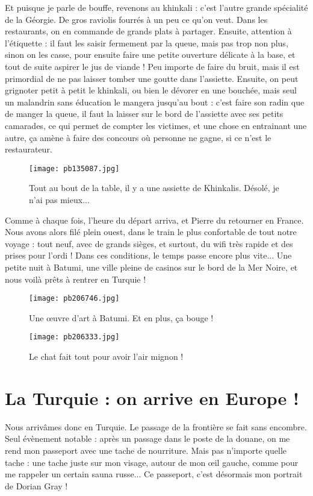 \documentclass{book}
\begin{document}
Et puisque je parle de bouffe, revenons au khinkali : c'est l'autre grande spécialité de la Géorgie. De gros raviolis fourrés à un peu ce qu'on veut. Dans les restaurants, on en commande de grands plats à partager. Ensuite, attention à l'étiquette : il faut les saisir fermement par la queue, mais pas trop non plus, sinon on les casse, pour ensuite faire une petite ouverture délicate à la base, et tout de suite aspirer le jus de viande ! Peu importe de faire du bruit, mais il est primordial de ne pas laisser tomber une goutte dans l'assiette. Ensuite, on peut grignoter petit à petit le khinkali, ou bien le dévorer en une bouchée, mais seul un malandrin sans éducation le mangera jusqu'au bout : c'est faire son radin que de manger la queue, il faut la laisser sur le bord de l'assiette avec ses petits camarades, ce qui permet de compter les victimes, et une chose en entrainant une autre, ça amène à faire des concours où personne ne gagne, si ce n'est le restaurateur.




\begin{figure}[h]
\centering
\texttt{[image: pb135087.jpg]}
\caption*{Tout au bout de la table, il y a une assiette de Khinkalis. Désolé, je n'ai pas mieux...}
\end{figure}

Comme à chaque fois, l'heure du départ arriva, et Pierre du retourner en France. Nous avons alors filé plein ouest, dans le train le plus confortable de tout notre voyage : tout neuf, avec de grands sièges, et surtout, du wifi très rapide et des prises pour l'ordi ! Dans ces conditions, le temps passe encore plus vite... Une petite nuit à Batumi, une ville pleine de casinos sur le bord de la Mer Noire, et nous voilà prêts à rentrer en Turquie !




\begin{figure}[h]
\centering
\texttt{[image: pb206746.jpg]}
\caption*{Une œuvre d'art à Batumi. Et en plus, ça bouge !}
\end{figure}


\begin{figure}[h]
\centering
\texttt{[image: pb206333.jpg]}
\caption*{Le chat fait tout pour avoir l'air mignon !}
\end{figure}





\chapter{La Turquie : on arrive en Europe !}
Nous arrivâmes donc en Turquie. Le passage de la frontière se fait sans encombre. Seul évènement notable : après un passage dans le poste de la douane, on me rend mon passeport avec une tache de nourriture. Mais pas n'importe quelle tache : une tache juste sur mon visage, autour de mon œil gauche, comme pour me rappeler un certain sauna russe... Ce passeport, c'est désormais mon portrait de Dorian Gray !
\end{document}
